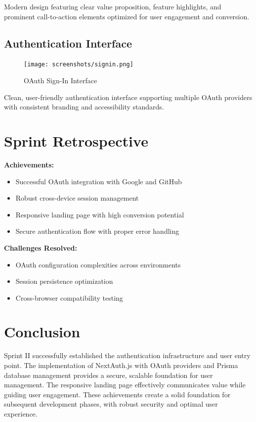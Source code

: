 Modern design featuring clear value proposition, feature highlights, and prominent call-to-action elements optimized for user engagement and conversion.

\subsection{Authentication Interface}
\begin{figure}[H]
    \centering
    \texttt{[image: screenshots/signin.png]}
    \caption{OAuth Sign-In Interface}
    \label{fig:signin_page}
\end{figure}

Clean, user-friendly authentication interface supporting multiple OAuth providers with consistent branding and accessibility standards.

\section{Sprint Retrospective}

\textbf{Achievements:}
\begin{itemize}
    \item Successful OAuth integration with Google and GitHub
    \item Robust cross-device session management
    \item Responsive landing page with high conversion potential
    \item Secure authentication flow with proper error handling
\end{itemize}

\textbf{Challenges Resolved:}
\begin{itemize}
    \item OAuth configuration complexities across environments
    \item Session persistence optimization
    \item Cross-browser compatibility testing
\end{itemize}

\section{Conclusion}

Sprint II successfully established the authentication infrastructure and user entry point. The implementation of NextAuth.js with OAuth providers and Prisma database management provides a secure, scalable foundation for user management. The responsive landing page effectively communicates value while guiding user engagement. These achievements create a solid foundation for subsequent development phases, with robust security and optimal user experience.